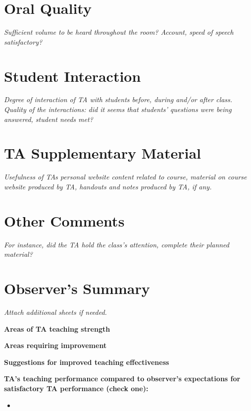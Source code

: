
\section{Oral Quality}
\textit{Sufficient volume to be heard throughout the room? Account, speed of
speech satisfactory?}


\section{Student Interaction}
\textit{Degree of interaction of TA with students before, during and/or after
class. Quality of the interactions: did it seems that students' questions
were being answered, student needs met?}


\section{TA Supplementary Material}
\textit{Usefulness of TAs personal website content related to course,
material on course website produced by TA, handouts and notes produced by TA,
if any.}


\section{Other Comments}
\textit{For instance, did the TA hold the class's attention, complete their
planned material?}


\section{Observer's Summary}
\textit{Attach additional sheets if needed.}

\begin{list}{\textbf{.}}{\leftmargin=1.4em}

  \item \textbf{Areas of TA teaching strength}

  \item \textbf{Areas requiring improvement}

  \item \textbf{Suggestions for improved teaching effectiveness}

  \item \textbf{TA's teaching performance compared to observer's expectations for
satisfactory TA performance (check one):}

  \begin{itemize}
    \item {}
  \end{itemize}

\end{list}


